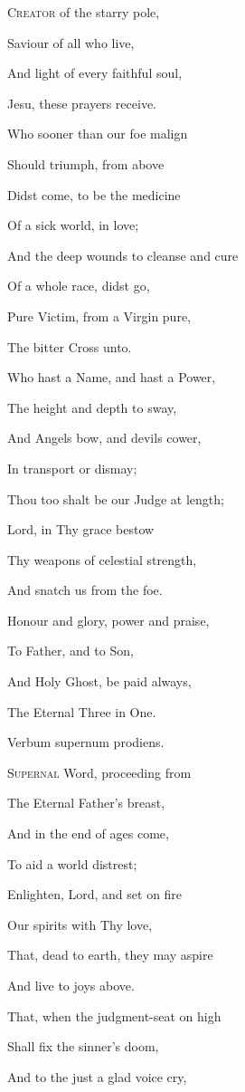 C\textsc{reator} of the starry pole,

Saviour of all who live,

And light of every faithful soul,

Jesu, these prayers receive.

Who sooner than our foe malign

Should triumph, from above

Didst come, to be the medicine

Of a sick world, in love;

And the deep wounds to cleanse and cure

Of a whole race, didst go,

Pure Victim, from a Virgin pure,

The bitter Cross unto. 

Who hast a Name, and hast a Power,

The height and depth to sway,

And Angels bow, and devils cower,

In transport or dismay;

Thou too shalt be our Judge at length;

Lord, in Thy grace bestow

Thy weapons of celestial strength,

And snatch us from the foe.

Honour and glory, power and praise,

To Father, and to Son,

And Holy Ghost, be paid always,

The Eternal Three in One.


Verbum supernum prodiens.

S\textsc{upernal} Word, proceeding from

The Eternal Father's breast,

And in the end of ages come,

To aid a world distrest;

Enlighten, Lord, and set on fire

Our spirits with Thy love,

That, dead to earth, they may aspire

And live to joys above.

That, when the judgment-seat on high

Shall fix the sinner's doom,

And to the just a glad voice cry,

